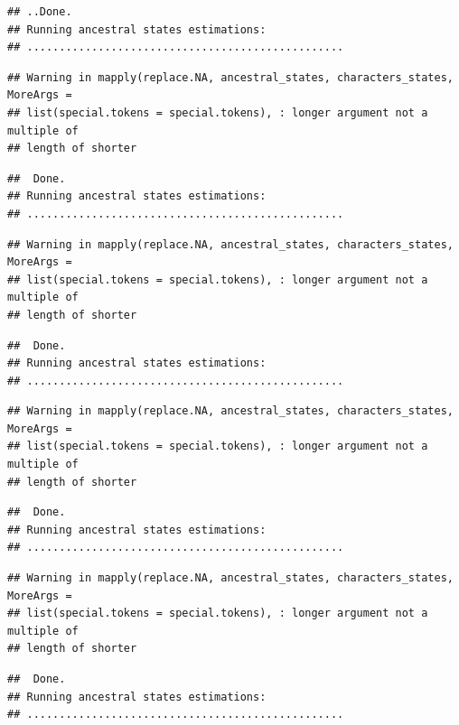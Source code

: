 \documentclass[
]{book}
\begin{document}
\begin{verbatim}
## ..Done.
## Running ancestral states estimations:
## .................................................
\end{verbatim}

\begin{verbatim}
## Warning in mapply(replace.NA, ancestral_states, characters_states, MoreArgs =
## list(special.tokens = special.tokens), : longer argument not a multiple of
## length of shorter
\end{verbatim}

\begin{verbatim}
##  Done.
## Running ancestral states estimations:
## .................................................
\end{verbatim}

\begin{verbatim}
## Warning in mapply(replace.NA, ancestral_states, characters_states, MoreArgs =
## list(special.tokens = special.tokens), : longer argument not a multiple of
## length of shorter
\end{verbatim}

\begin{verbatim}
##  Done.
## Running ancestral states estimations:
## .................................................
\end{verbatim}

\begin{verbatim}
## Warning in mapply(replace.NA, ancestral_states, characters_states, MoreArgs =
## list(special.tokens = special.tokens), : longer argument not a multiple of
## length of shorter
\end{verbatim}

\begin{verbatim}
##  Done.
## Running ancestral states estimations:
## .................................................
\end{verbatim}

\begin{verbatim}
## Warning in mapply(replace.NA, ancestral_states, characters_states, MoreArgs =
## list(special.tokens = special.tokens), : longer argument not a multiple of
## length of shorter
\end{verbatim}

\begin{verbatim}
##  Done.
## Running ancestral states estimations:
## .................................................
\end{verbatim}
\end{document}
